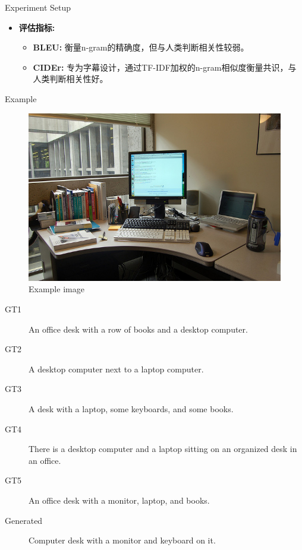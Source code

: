 \documentclass{beamer}
\begin{document}
\begin{CJK}{UTF8}{gbsn}
\begin{frame}{Experiment Setup}
\begin{itemize}
        \item \textbf{评估指标:}
        \begin{itemize}
            \item \textbf{BLEU:} 衡量n-gram的精确度，但与人类判断相关性较弱。
            \item \textbf{CIDEr:} 专为字幕设计，通过TF-IDF加权的n-gram相似度衡量共识，与人类判断相关性好。
        \end{itemize}
    \end{itemize}
\end{frame}

\begin{frame}{Example}
    \begin{figure}
        \centering
        \includegraphics[width=0.4\linewidth]{images/example_image.jpg}
        \caption{Example image}
        \label{fig:enter-label}
    \end{figure}

    \begin{description}
        \item[GT1] An office desk with a row of books and a desktop computer.
        \item[GT2] A desktop computer next to a laptop computer.
        \item[GT3] A desk with a laptop, some keyboards, and some books.
        \item[GT4] There is a desktop computer and a laptop sitting on an organized desk in an office.
        \item[GT5] An office desk with a monitor, laptop, and books.
        \item[Generated] Computer desk with a monitor and keyboard on it.
    \end{description}
    
\end{frame}


\end{CJK}
\end{document}
